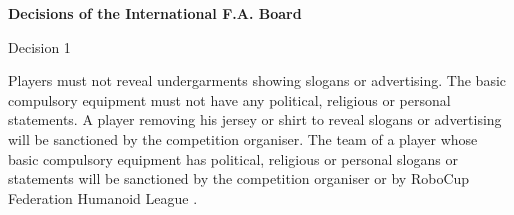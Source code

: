 \bigskip


{\bfseries Decisions of the International F.A. Board }

\headlinebox

Decision 1

Players must not reveal undergarments showing slogans or advertising. The basic
compulsory equipment must not have any political, religious or personal
statements. A player removing his jersey or shirt to reveal slogans or
advertising will be sanctioned by the competition organiser. The team of a
player whose basic compulsory equipment has political, religious or personal
slogans or statements will be sanctioned by the competition organiser
or by RoboCup Federation Humanoid League
.
